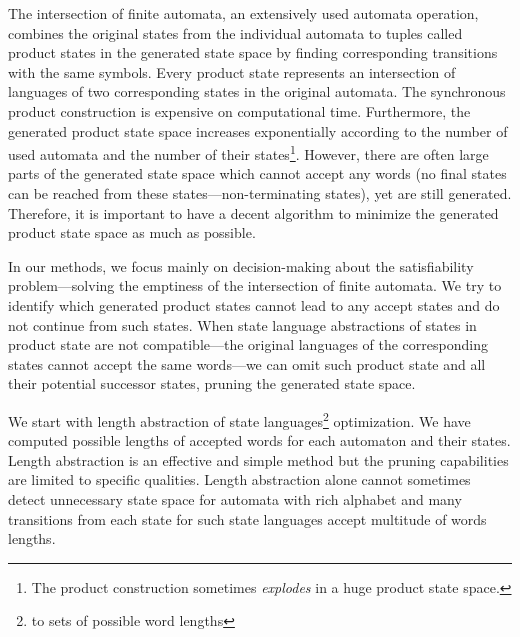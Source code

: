 
The intersection of finite automata, an extensively used automata operation, combines the original states from the individual automata to tuples called product states in the generated state space by finding corresponding transitions with the same symbols. Every product state represents an intersection of languages of two corresponding states in the original automata. The synchronous product construction is expensive on computational time. Furthermore, the generated product state space increases exponentially according to the number of used automata and the number of their states\footnote{The product construction sometimes \emph{explodes} in a huge product state space.}. However, there are often large parts of the generated state space which cannot accept any words (no final states can be reached from these states---non-terminating states), yet are still generated. Therefore, it is important to have a decent algorithm to minimize the generated product state space as much as possible.


In our methods, we focus mainly on decision-making about the satisfiability problem---solving the emptiness of the intersection of finite automata. We try to identify which generated product states cannot lead to any accept states and do not continue from such states. When state language abstractions of states in product state are not compatible---the original languages of the corresponding states cannot accept the same words---we can omit such product state and all their potential successor states, pruning the generated state space.


We start with length abstraction of state languages\footnote{to sets of possible word lengths} optimization. We have computed possible lengths of accepted words for each automaton and their states. Length abstraction is an effective and simple method but the pruning capabilities are limited to specific qualities. Length abstraction alone cannot sometimes detect unnecessary state space for automata with rich alphabet and many transitions from each state for such state languages accept multitude of words lengths.

